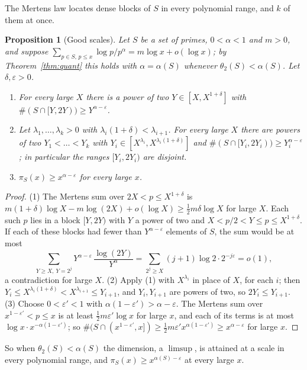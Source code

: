 \documentclass[11pt]{amsart}
\newtheorem{proposition}[lemma]{Proposition}
\theoremstyle{remark}
\numberwithin{equation}{section}
\newcommand{\eps}{\varepsilon}
\begin{document}
\medskip
The Mertens law locates dense blocks of $S$ in every polynomial range, and $k$ of them at once.

\begin{proposition}[Good scales]\label{prop:goodscales}
Let $S$ be a set of primes, $0<\alpha<1$ and $m>0$, and suppose $\sum_{p\in S,\,p\le x}\log p/p^{\alpha}=m\log x+o(\log x)$; by Theorem~\ref{thm:quant} this holds with $\alpha=\alpha(S)$ whenever $\theta_2(S)<\alpha(S)$. Let $\delta,\eps>0$.
\begin{enumerate}
\item For every large $X$ there is a power of two $Y\in[X,X^{1+\delta}]$ with $\#(S\cap[Y,2Y))\ge Y^{\alpha-\eps}$.
\item Let $\lambda_1,\dots,\lambda_k>0$ with $\lambda_i(1+\delta)<\lambda_{i+1}$. For every large $X$ there are powers of two $Y_1<\dots<Y_k$ with $Y_i\in[X^{\lambda_i},X^{\lambda_i(1+\delta)}]$ and $\#(S\cap[Y_i,2Y_i))\ge Y_i^{\alpha-\eps}$; in particular the ranges $[Y_i,2Y_i)$ are disjoint.
\item $\pi_S(x)\ge x^{\alpha-\eps}$ for every large $x$.
\end{enumerate}
\end{proposition}

\begin{proof}
(1) The Mertens sum over $2X<p\le X^{1+\delta}$ is $m(1+\delta)\log X-m\log(2X)+o(\log X)\ge\tfrac12m\delta\log X$ for large $X$. Each such $p$ lies in a block $[Y,2Y)$ with $Y$ a power of two and $X<p/2<Y\le p\le X^{1+\delta}$. If each of these blocks had fewer than $Y^{\alpha-\eps}$ elements of $S$, the sum would be at most
\[
\sum_{Y\ge X,\ Y=2^j}Y^{\alpha-\eps}\,\frac{\log(2Y)}{Y^{\alpha}}=\sum_{2^j\ge X}(j+1)\log2\cdot2^{-j\eps}=o(1),
\]
a contradiction for large $X$. (2) Apply (1) with $X^{\lambda_i}$ in place of $X$, for each $i$; then $Y_i\le X^{\lambda_i(1+\delta)}<X^{\lambda_{i+1}}\le Y_{i+1}$, and $Y_i,Y_{i+1}$ are powers of two, so $2Y_i\le Y_{i+1}$. (3) Choose $0<\eps'<1$ with $\alpha(1-\eps')>\alpha-\eps$. The Mertens sum over $x^{1-\eps'}<p\le x$ is at least $\tfrac12m\eps'\log x$ for large $x$, and each of its terms is at most $\log x\cdot x^{-\alpha(1-\eps')}$; so $\#(S\cap(x^{1-\eps'},x])\ge\tfrac12m\eps'x^{\alpha(1-\eps')}\ge x^{\alpha-\eps}$ for large $x$.
\end{proof}

So when $\theta_2(S)<\alpha(S)$ the dimension, a $\limsup$, is attained at a scale in every polynomial range, and $\pi_S(x)\ge x^{\alpha(S)-\eps}$ at every large $x$.
\end{document}
